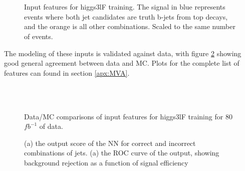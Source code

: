 

\begin{figure}[h!]
    \\
    \\
    \caption{Input features for higgs3lF training. The signal in blue represents events where both jet candidates are truth b-jets from top decays, and the orange is all other combinations. Scaled to the same number of events.}
    \label{fig:features_higgs3lF}
\end{figure}

The modeling of these inputs is validated against data, with figure \ref{fig:model_higgs3lF} showing good general agreement between data and MC. Plots for the complete list of features can found in section \ref{apx:MVA}.

\begin{figure}[h!]
    \\
    \\
    \caption{Data/MC comparisons of input features for higgs3lF training for 80 $fb^{-1}$ of data.}
    \label{fig:model_higgs3lF}
\end{figure} 

\begin{figure}[h!]
  \label{fig:higgs3lFresults}
  \caption{(a) the output score of the NN for correct and incorrect combinations of jets. (a) the ROC curve of the output, showing background rejection as a function of signal efficiency}
\end{figure} 

